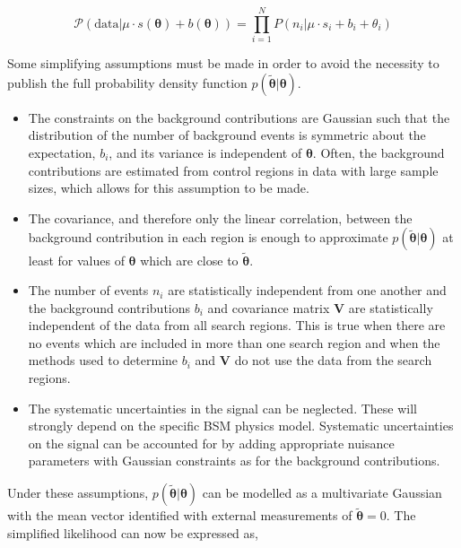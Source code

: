 \begin{equation}
\mathcal{P}(\mathrm{data}|\mu\cdot s(\boldsymbol{\theta}) + b(\boldsymbol{\theta})) = \prod_{i=1}^{N} P(n_{i}|\mu \cdot s_{i}+b_{i}+\theta_{i})
\label{eq:poisson-prob}
\end{equation}

Some simplifying assumptions must be made in order to avoid the necessity to publish the full probability density function $p(\tilde{\boldsymbol{\theta}}|\boldsymbol{\theta})$. 

\begin{itemize}
\item{The constraints on the background contributions are Gaussian such that the distribution of the number of background events is symmetric about the expectation, $b_{i}$, 
and its variance is independent of $\boldsymbol{\theta}$. Often, the background contributions are estimated from control regions in data with large sample sizes, which allows for this 
assumption to be made.}

\item{The covariance, and therefore only the linear correlation, between the background contribution in each region is enough to approximate $p(\tilde{\boldsymbol{\theta}}|\boldsymbol{\theta})$ 
at least for values of $\boldsymbol{\theta}$ which are close to $\tilde{\boldsymbol{\theta}}$.}

\item{The number of events $n_{i}$ are statistically independent from one another and the background contributions $b_{i}$ and covariance matrix $\mathrm{\mathbf{V}}$ are 
statistically independent of the data from all search regions. This is true when there are no events which are included in more than one search region and when the methods used to 
determine $b_{i}$ and $\mathrm{\mathbf{V}}$ do not use the data from the search regions.}

\item{The systematic uncertainties in the signal can be neglected. These will strongly depend on the specific BSM physics model. 
Systematic uncertainties on the signal can be accounted for by adding appropriate nuisance parameters with Gaussian constraints 
as for the background contributions. }
\end{itemize}

Under these assumptions, $p(\tilde{\boldsymbol{\theta}}|\boldsymbol{\theta})$ can be modelled as a multivariate Gaussian with the mean vector identified with external measurements of 
$\tilde{\boldsymbol{\theta}}=0$. The simplified likelihood can now be expressed as,

